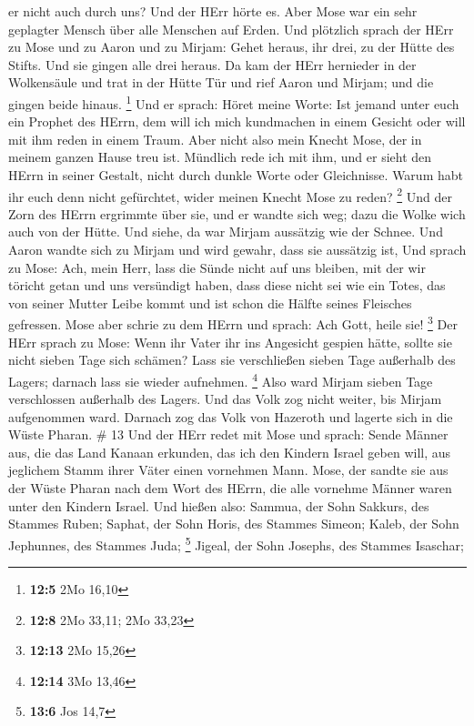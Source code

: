 er nicht auch durch uns? Und der HErr hörte es.  Aber Mose
war ein sehr geplagter Mensch über alle Menschen auf Erden. 
Und plötzlich sprach der HErr zu Mose und zu Aaron und zu Mirjam: Gehet
heraus, ihr drei, zu der Hütte des Stifts. Und sie gingen alle drei
heraus.  Da kam der HErr hernieder in der Wolkensäule und
trat in der Hütte Tür und rief Aaron und Mirjam; und die gingen beide
hinaus. \footnote{\textbf{12:5} 2Mo 16,10}  Und er sprach:
Höret meine Worte: Ist jemand unter euch ein Prophet des HErrn, dem will
ich mich kundmachen in einem Gesicht oder will mit ihm reden in einem
Traum.  Aber nicht also mein Knecht Mose, der in meinem
ganzen Hause treu ist.  Mündlich rede ich mit ihm, und er
sieht den HErrn in seiner Gestalt, nicht durch dunkle Worte oder
Gleichnisse. Warum habt ihr euch denn nicht gefürchtet, wider meinen
Knecht Mose zu reden? \footnote{\textbf{12:8} 2Mo 33,11; 2Mo 33,23}
 Und der Zorn des HErrn ergrimmte über sie, und er wandte
sich weg;  dazu die Wolke wich auch von der Hütte. Und
siehe, da war Mirjam aussätzig wie der Schnee. Und Aaron wandte sich zu
Mirjam und wird gewahr, dass sie aussätzig ist,  Und sprach
zu Mose: Ach, mein Herr, lass die Sünde nicht auf uns bleiben, mit der
wir töricht getan und uns versündigt haben,  dass diese
nicht sei wie ein Totes, das von seiner Mutter Leibe kommt und ist schon
die Hälfte seines Fleisches gefressen.  Mose aber schrie zu
dem HErrn und sprach: Ach Gott, heile sie! \footnote{\textbf{12:13} 2Mo
  15,26}  Der HErr sprach zu Mose: Wenn ihr Vater ihr ins
Angesicht gespien hätte, sollte sie nicht sieben Tage sich schämen? Lass
sie verschließen sieben Tage außerhalb des Lagers; darnach lass sie
wieder aufnehmen. \footnote{\textbf{12:14} 3Mo 13,46}  Also
ward Mirjam sieben Tage verschlossen außerhalb des Lagers. Und das Volk
zog nicht weiter, bis Mirjam aufgenommen ward.  Darnach zog
das Volk von Hazeroth und lagerte sich in die Wüste Pharan. \# 13
 Und der HErr redet mit Mose und sprach:  Sende
Männer aus, die das Land Kanaan erkunden, das ich den Kindern Israel
geben will, aus jeglichem Stamm ihrer Väter einen vornehmen Mann.
 Mose, der sandte sie aus der Wüste Pharan nach dem Wort des
HErrn, die alle vornehme Männer waren unter den Kindern Israel.
 Und hießen also: Sammua, der Sohn Sakkurs, des Stammes
Ruben;  Saphat, der Sohn Horis, des Stammes Simeon;
 Kaleb, der Sohn Jephunnes, des Stammes Juda; \footnote{\textbf{13:6}
  Jos 14,7}  Jigeal, der Sohn Josephs, des Stammes Isaschar;
